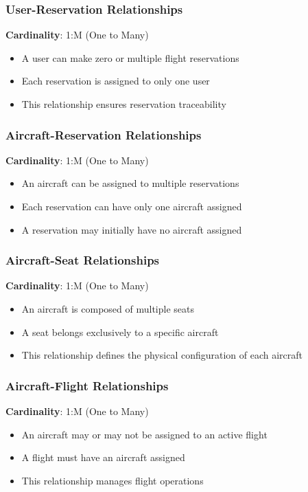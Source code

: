 \documentclass[conference]{IEEEtran}
\begin{document}
    \subsubsection{User-Reservation Relationships}
    \textbf{Cardinality}: 1:M (One to Many)
    \begin{itemize}
        \item A user can make zero or multiple flight reservations
        \item Each reservation is assigned to only one user
        \item This relationship ensures reservation traceability
    \end{itemize}

    \subsubsection{Aircraft-Reservation Relationships}
    \textbf{Cardinality}: 1:M (One to Many)
    \begin{itemize}
        \item An aircraft can be assigned to multiple reservations
        \item Each reservation can have only one aircraft assigned
        \item A reservation may initially have no aircraft assigned
    \end{itemize}

    \subsubsection{Aircraft-Seat Relationships}
    \textbf{Cardinality}: 1:M (One to Many)
    \begin{itemize}
        \item An aircraft is composed of multiple seats
        \item A seat belongs exclusively to a specific aircraft
        \item This relationship defines the physical configuration of each aircraft
    \end{itemize}

    \subsubsection{Aircraft-Flight Relationships}
    \textbf{Cardinality}: 1:M (One to Many)
    \begin{itemize}
        \item An aircraft may or may not be assigned to an active flight
        \item A flight must have an aircraft assigned
        \item This relationship manages flight operations
    \end{itemize}
\end{document}
